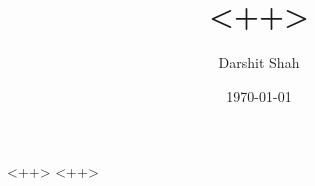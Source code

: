 \documentclass[a4paper,10pt,final]{report}
\author{Darshit Shah}
\date{\today}
\title{<++>}
\begin{document}
\maketitle
\tableofcontents

\abstract
<++>
<++>
\end{document}
